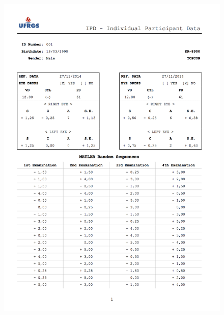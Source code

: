 \begin{figure}[h]
	
	\centering
	\includegraphics[width=1.0\linewidth]{__Images/08/IPD_001_1.png}
\end{figure}

